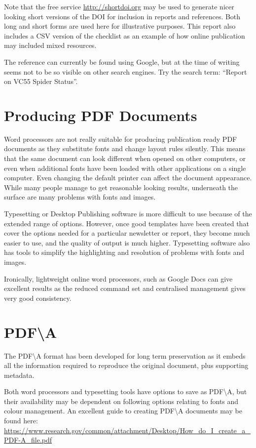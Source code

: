 \documentclass{article}
\begin{document}
 Note that the free service \url{http://shortdoi.org}  may be used to generate nicer looking short versions of the DOI for inclusion in reports and references. Both long and short forms are used here for illustrative purposes. This report  also includes a CSV version of the checklist as an example of how online publication may included mixed resources.

The reference can currently be found using Google, but at the time of writing seems not to be so visible on other search engines. Try the search term: \enquote{Report on VC55 Spider Status}.

\section{Producing PDF Documents}

Word processors are not really suitable for producing publication ready PDF documents as they substitute fonts and change layout rules silently. This means that the same document can look different when opened on other computers, or even when additional fonts have been loaded with other applications on a single computer. Even changing the default printer can affect the document  appearance. While many people manage to get reasonable looking results, underneath the surface are many problems with fonts and images.

Typesetting or Desktop Publishing software is more difficult to use because of the extended range of options. However, once good templates have been created that cover the options needed for a particular newsletter or report, they become much easier to use, and the quality of  output is much higher.  Typesetting software also has tools to simplify the highlighting and resolution of problems with fonts and images.

Ironically, lightweight online word processors, such as Google Docs can give excellent results as the reduced command set and centralised management gives very good consistency.

\section{PDF\textbackslash A}

The PDF\textbackslash A format has been developed for long term preservation  as it embeds all the information required to reproduce the original document, plus supporting metadata. 

Both word processors and typesetting tools have options to save as PDF\textbackslash A, but their availability may be dependent on following options relating to fonts and colour management. An excellent guide to creating PDF\textbackslash A  documents may be found here: \\ \url{https://www.research.gov/common/attachment/Desktop/How_do_I_create_a_PDF-A_file.pdf}
 
\end{document}
